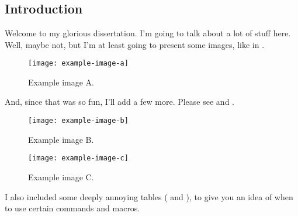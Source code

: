 \chapter{\MyChapOne}



\section{Introduction}
\label{sec:1-Intro}

Welcome to my glorious dissertation.
I'm going to talk about a lot of stuff here.
Well, maybe not, but I'm at least going to present some images, like in .

\begin{figure}[htb]
\centering
\texttt{[image: example-image-a]}
\caption{Example image A.}
\label{fig:1-example}
\end{figure}

And, since that was so fun, I'll add a few more. Please see  and .

\begin{figure}[htb]
\centering
\texttt{[image: example-image-b]}
\caption{Example image B.}
\label{fig:1-ex2}
\end{figure}

\begin{figure}[htb]
\centering
\texttt{[image: example-image-c]}
\caption{Example image C.}
\label{fig:1-ex3}
\end{figure}

I also included some deeply annoying tables ( and ), to give you an idea of when to use certain commands and macros.

